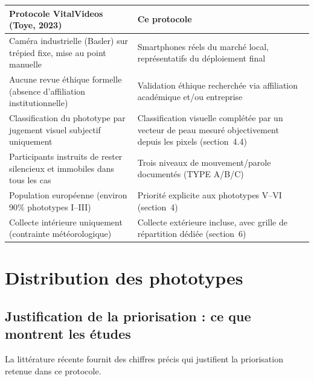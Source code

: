 \documentclass[11pt,a4paper]{article}
\begin{document}
\begin{center}
\begin{tabularx}{\textwidth}{X X}
\toprule
\textbf{Protocole VitalVideos (Toye, 2023)} & \textbf{Ce protocole} \\
\midrule
Cam\'era industrielle (Basler) sur tr\'epied fixe, mise au point manuelle &
Smartphones r\'eels du march\'e local, repr\'esentatifs du d\'eploiement
final \\
Aucune revue \'ethique formelle (absence d'affiliation institutionnelle) &
Validation \'ethique recherch\'ee via affiliation acad\'emique et/ou
entreprise \\
Classification du phototype par jugement visuel subjectif uniquement &
Classification visuelle compl\'et\'ee par un vecteur de peau mesur\'e
objectivement depuis les pixels (section~4.4) \\
Participants instruits de rester silencieux et immobiles dans tous les cas &
Trois niveaux de mouvement/parole document\'es (TYPE A/B/C) \\
Population europ\'eenne (environ 90\% phototypes I--III) &
Priorit\'e explicite aux phototypes V--VI (section~4) \\
Collecte int\'erieure uniquement (contrainte m\'et\'eorologique) &
Collecte ext\'erieure incluse, avec grille de r\'epartition d\'edi\'ee
(section~6) \\
\bottomrule
\end{tabularx}
\end{center}

\newpage
\section{Distribution des phototypes}

\subsection{Justification de la priorisation : ce que montrent les
\'etudes}

La litt\'erature r\'ecente fournit des chiffres pr\'ecis qui justifient la
priorisation retenue dans ce protocole.
\end{document}
